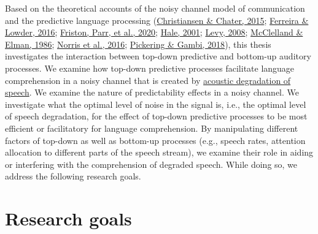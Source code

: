 \documentclass[a4paper, nobind]{templates/ociamthesis}
\begin{document}
Based on the theoretical accounts of the noisy channel model of communication and the predictive language processing (\protect\hyperlink{ref-Christiansen2015}{Christiansen \& Chater, 2015}; \protect\hyperlink{ref-Ferreira2016}{Ferreira \& Lowder, 2016}; \protect\hyperlink{ref-Friston2020}{Friston, Parr, et al., 2020}; \protect\hyperlink{ref-Hale2001}{Hale, 2001}; \protect\hyperlink{ref-Levy2008}{Levy, 2008}; \protect\hyperlink{ref-Mcclelland1986}{McClelland \& Elman, 1986}; \protect\hyperlink{ref-Norris2016}{Norris et al., 2016}; \protect\hyperlink{ref-Pickering2018}{Pickering \& Gambi, 2018}),
this thesis investigates the interaction between top-down predictive and bottom-up auditory processes.
We examine how top-down predictive processes facilitate language comprehension in a noisy channel that is created by \protect\hyperlink{speech-processing}{acoustic degradation of speech}.
We examine the nature of predictability effects in a noisy channel.
We investigate what the optimal level of noise in the signal is, i.e., the optimal level of speech degradation,
for the effect of top-down predictive processes to be most efficient or facilitatory for language comprehension.
By manipulating different factors of top-down as well as bottom-up processes (e.g., speech rates, attention allocation to different parts of the speech stream),
we examine their role in aiding or interfering with the comprehension of degraded speech.
While doing so, we address the following research goals.

\hypertarget{research-goals}{%
\section{Research goals}\label{research-goals}}
\end{document}
